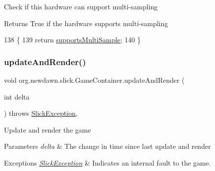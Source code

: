 Check if this hardware can support multi-\/sampling

\begin{DoxyReturn}{Returns}
True if the hardware supports multi-\/sampling 
\end{DoxyReturn}

\begin{DoxyCode}
138                                          \{
139         \textcolor{keywordflow}{return} \mbox{\hyperlink{classorg_1_1newdawn_1_1slick_1_1_game_container_ad9fbc79ea908ad3d82d274e9614747ad}{supportsMultiSample}};
140     \}
\end{DoxyCode}
\mbox{\label{classorg_1_1newdawn_1_1slick_1_1_game_container_a91b4f51ca42ad0b9dcca0e9fc2118f9f}} 
\subsubsection{\texorpdfstring{update\+And\+Render()}{updateAndRender()}}
{\footnotesize\ttfamily void org.\+newdawn.\+slick.\+Game\+Container.\+update\+And\+Render (\begin{DoxyParamCaption}\item[{int}]{delta }\end{DoxyParamCaption}) throws \mbox{\hyperlink{classorg_1_1newdawn_1_1slick_1_1_slick_exception}{Slick\+Exception}}\hspace{0.3cm}{\ttfamily [inline]}, {\ttfamily [protected]}}

Update and render the game


\begin{DoxyParams}{Parameters}
{\em delta} & The change in time since last update and render \\
\hline
\end{DoxyParams}

\begin{DoxyExceptions}{Exceptions}
{\em \mbox{\hyperlink{classorg_1_1newdawn_1_1slick_1_1_slick_exception}{Slick\+Exception}}} & Indicates an internal fault to the game. \\
\hline
\end{DoxyExceptions}

